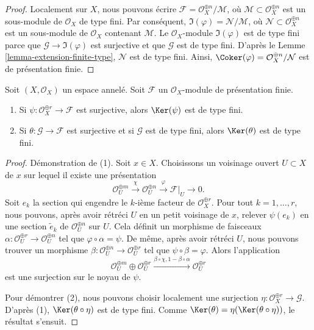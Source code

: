 \begin{proof}
Localement sur $X$, nous pouvons écrire
$\mathcal{F} = \mathcal{O}_X^{\oplus n} / \mathcal{M}$, où
$\mathcal{M} \subset \mathcal{O}_X^{\oplus n}$ est un sous-module de
$\mathcal{O}_X$ de type fini. Par conséquent,
$\Im(\varphi) = \mathcal{N} / \mathcal{M}$, où
$\mathcal{N} \subset \mathcal{O}_X^{\oplus n}$ est un sous-module de
$\mathcal{O}_X$ contenant $\mathcal{M}$.
Le $\mathcal{O}_X$-module $\Im(\varphi)$ est de type fini
parce que $\mathcal{G} \to \Im(\varphi)$ est surjective et que
$\mathcal{G}$ est de type fini. D'après le Lemme
\ref{lemma-extension-finite-type}, $\mathcal{N}$ est de type fini. Ainsi,
$\Coker(\varphi) = \mathcal{O}_X^{\oplus n} / \mathcal{N}$
est de présentation finie.
\end{proof}

\begin{lemma}
\label{lemma-kernel-surjection-finite-free-onto-finite-presentation}
Soit $(X, \mathcal{O}_X)$ un espace annelé.
Soit $\mathcal{F}$ un $\mathcal{O}_X$-module de présentation finie.
\begin{enumerate}
\item Si $\psi : \mathcal{O}_X^{\oplus r} \to \mathcal{F}$ est surjective,
alors $\Ker(\psi)$ est de type fini.
\item Si $\theta : \mathcal{G} \to \mathcal{F}$ est surjective et si
$\mathcal{G}$ est de type fini, alors $\Ker(\theta)$ est de type fini.
\end{enumerate}
\end{lemma}

\begin{proof}
Démonstration de (1).
Soit $x \in X$. Choisissons un voisinage ouvert $U \subset X$ de $x$
sur lequel il existe une présentation
$$
\mathcal{O}_U^{\oplus m}
\xrightarrow{\chi}
\mathcal{O}_U^{\oplus n}
\xrightarrow{\varphi}
\mathcal{F}|_U
\to
0.
$$
Soit $e_k$ la section qui engendre le $k$-ième facteur de
$\mathcal{O}_X^{\oplus r}$. Pour tout $k = 1, \ldots, r$,
nous pouvons, après avoir rétréci $U$ en un petit voisinage de $x$,
relever $\psi(e_k)$ en une section $\tilde e_k$ de
$\mathcal{O}_U^{\oplus n}$ sur $U$. Cela définit un morphisme
de faisceaux $\alpha : \mathcal{O}_U^{\oplus r} \to \mathcal{O}_U^{\oplus n}$
tel que $\varphi \circ \alpha = \psi$.
De même, après avoir rétréci $U$, nous pouvons trouver un morphisme
$\beta : \mathcal{O}_U^{\oplus n} \to \mathcal{O}_U^{\oplus r}$
tel que $\psi \circ \beta = \varphi$. Alors l'application
$$
\mathcal{O}_U^{\oplus m} \oplus
\mathcal{O}_U^{\oplus r}
\xrightarrow{\beta \circ \chi, 1 - \beta \circ \alpha}
\mathcal{O}_U^{\oplus r}
$$
est une surjection sur le noyau de $\psi$.

\medskip\noindent
Pour démontrer (2), nous pouvons choisir localement une surjection
$\eta : \mathcal{O}_X^{\oplus r} \to \mathcal{G}$.
D'après (1), $\Ker(\theta \circ \eta)$ est de type fini.
Comme $\Ker(\theta) = \eta(\Ker(\theta \circ \eta))$, le résultat s'ensuit.
\end{proof}

